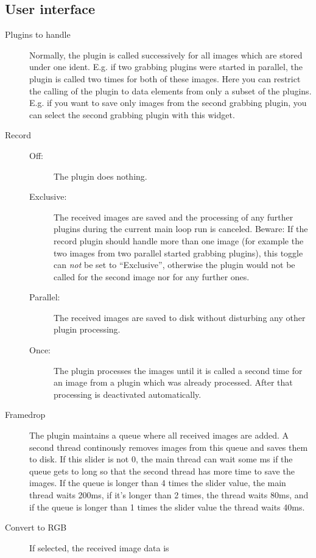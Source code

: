 \subsection{User interface}

\begin{description}
\item[Plugins to handle] Normally, the plugin is called successively
  for all images which are stored under one ident. E.g. if two
  grabbing plugins were started in parallel, the plugin is called
  two times for both of these images. Here you can restrict the
  calling of the plugin to data elements from only a subset of
  the plugins. E.g. if you want to save only images from the second
  grabbing plugin, you can select the second grabbing plugin with
  this widget.
\item[Record]\hfill
  \begin{description}
  \item[Off:] The plugin does nothing.
  \item [Exclusive:] The received images are saved and the processing
    of any further plugins during the current main loop run is
    canceled. Beware: If the record plugin should handle more than
    one image (for example the two images from two parallel started
    grabbing plugins), this toggle can \emph{not} be set to
    ``Exclusive'', otherwise the plugin would not be called for the
    second image nor for any further ones.
  \item[Parallel:] The received images are saved to disk without
    disturbing any other plugin processing.
  \item[Once:] The plugin processes the images until it is called a
    second time for an image from a plugin which was already
    processed. After that processing is deactivated automatically.
  \end{description}
\item[Framedrop] The plugin maintains a queue where all received
  images are added. A second thread continously removes images from
  this queue and saves them to disk. If this slider is not 0, the
  main thread can wait some ms if the queue gets to long so that the
  second thread has more time to save the images. If the queue is
  longer than 4 times the slider value, the main thread waits 200ms,
  if it's longer than 2 times, the thread waits 80ms, and if the
  queue is longer than 1 times the slider value the thread waits
  40ms.
\item[Convert to RGB] If selected, the received image data is

\end{description}
